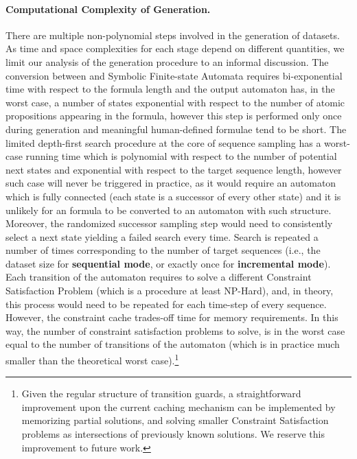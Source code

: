 \paragraph{Computational Complexity of Generation.}
There are multiple non-polynomial steps involved in the generation of datasets.
As time and space complexities for each stage depend on different quantities, we limit our analysis of the generation procedure to an informal discussion.
%
The conversion between \LTLf and Symbolic Finite-state Automata requires bi-exponential time with respect to the formula length and the output automaton has, in the worst case, a number of states exponential with respect to the number of atomic propositions appearing in the formula, however this step is performed only once during generation and meaningful human-defined formulae tend to be short.
%
The limited depth-first search procedure at the core of sequence sampling has a worst-case running time which is polynomial with respect to the number of potential next states and exponential with respect to the target sequence length, however such case will never be triggered in practice, as it would require an automaton which is fully connected (each state is a successor of every other state) and it is unlikely for an \LTLf formula to be converted to an automaton with such structure. Moreover, the randomized successor sampling step would need to consistently select a next state yielding a failed search every time.
Search is repeated a number of times corresponding to the number of target sequences (i.e., the dataset size for \textbf{sequential mode}, or exactly once for \textbf{incremental mode}).
Each transition of the automaton requires to solve a different Constraint Satisfaction Problem (which is a procedure at least NP-Hard), and, in theory, this process would need to be repeated for each time-step of every sequence.
However, the constraint cache trades-off time for memory requirements. In this way, the number of constraint satisfaction problems to solve, is in the worst case equal to the number of transitions of the automaton (which is in practice much smaller than the theoretical worst case).\footnote{Given the regular structure of transition guards, a straightforward improvement upon the current caching mechanism can be implemented by memorizing partial solutions, and solving smaller Constraint Satisfaction problems as intersections of previously known solutions. We reserve this improvement to future work.}

